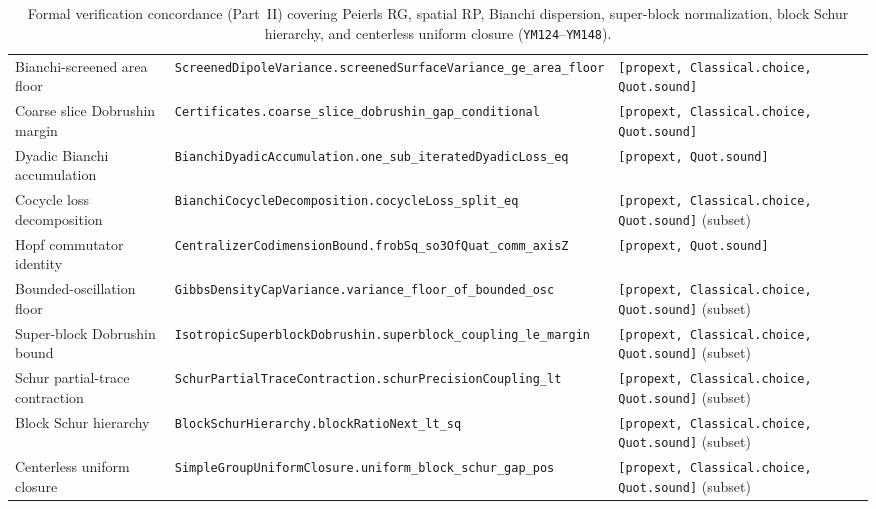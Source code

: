 \documentclass[11pt,a4paper]{article}
\begin{document}
\begin{table}[ht]
\begin{tabular}{@{}p{4.3cm}p{6.6cm}p{3.4cm}@{}}
Bianchi-screened area floor & \texttt{ScreenedDipoleVariance.}\newline\texttt{screenedSurfaceVariance\_ge\_area\_floor} & \texttt{[propext, Classical.choice,} \texttt{Quot.sound]} \\
Coarse slice Dobrushin margin & \texttt{Certificates.}\newline\texttt{coarse\_slice\_dobrushin\_gap\_conditional} & \texttt{[propext, Classical.choice,} \texttt{Quot.sound]} \\
Dyadic Bianchi accumulation & \texttt{BianchiDyadicAccumulation.}\newline\texttt{one\_sub\_iteratedDyadicLoss\_eq} & \texttt{[propext, Quot.sound]} \\
Cocycle loss decomposition & \texttt{BianchiCocycleDecomposition.}\newline\texttt{cocycleLoss\_split\_eq} & \texttt{[propext, Classical.choice,} \texttt{Quot.sound]} (subset) \\
Hopf commutator identity & \texttt{CentralizerCodimensionBound.}\newline\texttt{frobSq\_so3OfQuat\_comm\_axisZ} & \texttt{[propext, Quot.sound]} \\
Bounded-oscillation floor & \texttt{GibbsDensityCapVariance.}\newline\texttt{variance\_floor\_of\_bounded\_osc} & \texttt{[propext, Classical.choice,} \texttt{Quot.sound]} (subset) \\
Super-block Dobrushin bound & \texttt{IsotropicSuperblockDobrushin.}\newline\texttt{superblock\_coupling\_le\_margin} & \texttt{[propext, Classical.choice,} \texttt{Quot.sound]} (subset) \\
Schur partial-trace contraction & \texttt{SchurPartialTraceContraction.}\newline\texttt{schurPrecisionCoupling\_lt} & \texttt{[propext, Classical.choice,} \texttt{Quot.sound]} (subset) \\
Block Schur hierarchy & \texttt{BlockSchurHierarchy.}\newline\texttt{blockRatioNext\_lt\_sq} & \texttt{[propext, Classical.choice,} \texttt{Quot.sound]} (subset) \\
Centerless uniform closure & \texttt{SimpleGroupUniformClosure.}\newline\texttt{uniform\_block\_schur\_gap\_pos} & \texttt{[propext, Classical.choice,} \texttt{Quot.sound]} (subset) \\
\bottomrule
\end{tabular}
\caption{Formal verification concordance (Part~II) covering Peierls RG, spatial RP, Bianchi dispersion, super-block normalization, block Schur hierarchy, and centerless uniform closure (\texttt{YM124}--\texttt{YM148}).}
\label{tab:paper4-concordance-ext}
\end{table}
\end{document}
